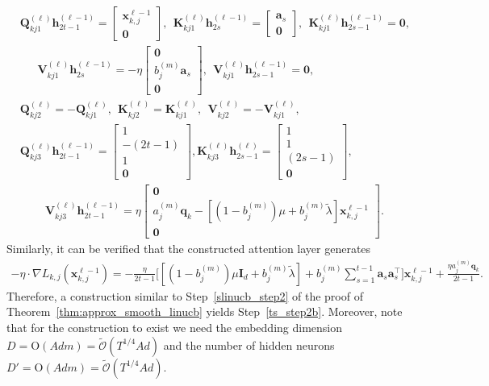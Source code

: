 \documentclass[10pt]{article}
\newcommand{\id}{\bI}
\newcommand{\<}{\left\langle}
\renewcommand{\>}{\right\rangle}
\renewcommand{\bQ}{\mathbf{Q}}
\newcommand{\bzero}{{\mathbf 0}}
\newcommand{\prodeig}{{\mu}}
\newcommand{\intvec}{{\mathbf {q}}}
\newcommand{\tcO}{{\tilde{\mathcal O}}}
\newcommand{\hidden}{{D'}}
\newcommand{\conO}{{\mathrm{O}}}
\def\bI{{\mathbf I}}
\def\bK{{\mathbf K}}
\def\bQ{{\mathbf Q}}
\def\bV{{\mathbf V}}
\def\ba{{\mathbf a}}
\def\bh{{\mathbf h}}
\def\bx{{\mathbf x}}
\begin{document}
\begin{align*}
    &\bQ_{kj1}^{(\ell)}\bh^{(\ell-1)}_{2t-1}=\begin{bmatrix}
        \bx_{k,j}^{\ell-1}\\\bzero
    \end{bmatrix},~~ \bK_{kj1}^{(\ell)}\bh^{(\ell-1)}_{2s}=\begin{bmatrix}
        \ba_{s}\\\bzero
\end{bmatrix},~~\bK_{kj1}^{(\ell)}\bh^{(\ell-1)}_{2s-1}=\bzero,\\
&~~~~ ~~~\bV_{kj1}^{(\ell)}\bh^{(\ell-1)}_{2s}=-\eta\begin{bmatrix}
        \bzero\\ b_j^{(m)}\ba_s \\ \bzero
    \end{bmatrix},~~\bV_{kj1}^{(\ell)}\bh^{(\ell-1)}_{2s-1}=\bzero,\\
    &
    \bQ_{kj2}^{(\ell)}=-\bQ_{kj1}^{(\ell)},~~ \bK_{kj2}^{(\ell)}=\bK_{kj1}^{(\ell)},~~  \bV_{kj2}^{(\ell)}=-\bV_{kj1}^{(\ell)},\\
     &
     \bQ_{kj3}^{(\ell)}\bh^{(\ell-1)}_{2t-1}=\begin{bmatrix}
         1\\-(2t-1)\\ 1\\\bzero
    \end{bmatrix},
\bK_{kj3}^{(\ell)}\bh^{(\ell)}_{2s-1}=\begin{bmatrix}
        1\\ 1 \\(2s-1)\\\bzero
    \end{bmatrix}, \\&\qquad~\bV_{kj3}^{(\ell)}\bh^{(\ell-1)}_{2t-1}=\eta\begin{bmatrix}
        \bzero\\ a_j^{(m)}\intvec_k-[(1-b_j^{(m)})\prodeig+b_j^{(m)}\tilde\lambda]\bx_{k,j}^{\ell-1}\\ \bzero
    \end{bmatrix}.
\end{align*}
Similarly, it can be verified that the constructed attention layer generates
\begin{align*}
  -\eta\cdot\nabla L_{k,j}(\bx_{k,j}^{\ell-1})=-\frac{\eta}{2t-1}\Big[ [(1-b_j^{(m)})\prodeig\id_d+b_j^{(m)}\tilde\lambda]+b_j^{(m)}\sum_{s=1}^{t-1}\ba_s\ba_s^\top \Big]\bx_{k,j}^{\ell-1}+\frac{\eta a_j^{(m)}\intvec_k}{2t-1}.
\end{align*}
Therefore,  a  construction similar to  Step~\ref{slinucb_step2} of the proof of Theorem~\ref{thm:approx_smooth_linucb} yields Step~\ref{ts_step2b}. Moreover, note that for the construction to exist  we need the embedding dimension  $D=\conO(Adm)=\tcO(T^{1/4}Ad)$ and the number of hidden neurons $\hidden=\conO(Adm)=\tcO(T^{1/4}Ad)$.
\end{document}
